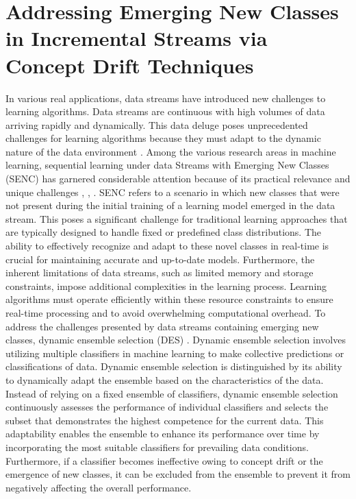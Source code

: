  
\chapter{Addressing Emerging New Classes in Incremental Streams via Concept Drift Techniques}
  \label{chapter:5_emerging}
  
  In various real applications, data streams have introduced new challenges to learning algorithms. Data streams are continuous with high volumes of data arriving rapidly and dynamically. This data deluge poses unprecedented challenges for learning algorithms because they must adapt to the dynamic nature of the data environment \cite{yang2021concept, dong2019multistream, shan2018online}. Among the various research areas in machine learning, sequential learning under data Streams with Emerging New Classes (SENC) has garnered considerable attention because of its practical relevance and unique challenges \cite{da2014learning}, \cite{mu2017streaming}, \cite{zhu2020semi}. SENC refers to a scenario in which new classes that were not present during the initial training of a learning model emerged in the data stream. This poses a significant challenge for traditional learning approaches that are typically designed to handle fixed or predefined class distributions. The ability to effectively recognize and adapt to these novel classes in real-time is crucial for maintaining accurate and up-to-date models. Furthermore, the inherent limitations of data streams, such as limited memory and storage constraints, impose additional complexities in the learning process. Learning algorithms must operate efficiently within these resource constraints to ensure real-time processing and to avoid overwhelming computational overhead.
To address the challenges presented by data streams containing emerging new classes, dynamic ensemble selection (DES) \cite{cruz2017meta, jackowski2014improved, kuncheva2000clustering}. Dynamic ensemble selection involves utilizing multiple classifiers in machine learning to make collective predictions or classifications of data. Dynamic ensemble selection is distinguished by its ability to dynamically adapt the ensemble based on the characteristics of the data. Instead of relying on a fixed ensemble of classifiers, dynamic ensemble selection continuously assesses the performance of individual classifiers and selects the subset that demonstrates the highest competence for the current data. This adaptability enables the ensemble to enhance its performance over time by incorporating the most suitable classifiers for prevailing data conditions. Furthermore, if a classifier becomes ineffective owing to concept drift or the emergence of new classes, it can be excluded from the ensemble to prevent it from negatively affecting the overall performance.
